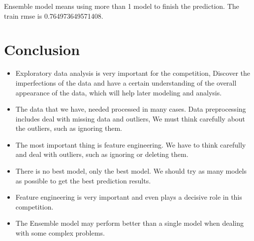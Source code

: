 Ensemble model means using 
more than 1 model to finish the prediction.
The train rmse is 0.764973649571408.

\section{Conclusion}

\begin{itemize}
	\item Exploratory data analysis is 
	very important for the competition,
	Discover the imperfections of the 
	data and have a certain understanding 
	of the overall appearance of the data, 
	which will help later modeling and analysis. 
	\item The data that we have,
	needed processed in many cases.
	Data preprocessing includes 
	deal with missing data and outliers, 
	We must think carefully about the outliers, 
	such as ignoring them.
	\item The most important thing is
	feature engineering.
	We have to think carefully and 
	deal with outliers, such as ignoring 
	or deleting them.
	\item There is no best model, 
	only the best model. We should 
	try as many models as possible to 
	get the best prediction results. 
	\item Feature engineering is very 
	important and even plays a decisive 
	role in this competition.
	\item The Ensemble model may perform better 
	than a single model when dealing 
	with some complex problems.	
\end{itemize}











